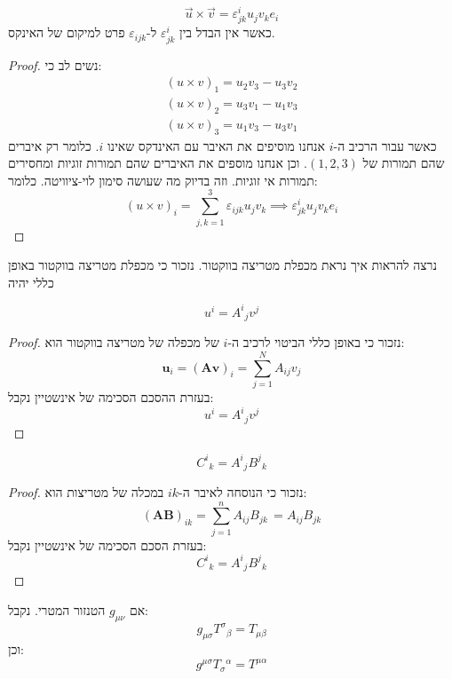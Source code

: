 \documentclass{tstextbook}
\begin{document}
\begin{proposition}
$$\vec{u}\times \vec{v}=\varepsilon_{j k}^{i}u_{j}v_{k}e_{i}$$
כאשר אין הבדל בין \(\varepsilon_{jk}^i\) ל-\(\varepsilon_{ijk}\) פרט למיקום של האינקס.

\end{proposition}
\begin{proof}
נשים לב כי:
$$\begin{array}{l}{{(u\times v)_{1}=u_{2}v_{3}-u_{3}v_{2}}}\\ {{(u\times v)_{2}=u_{3}v_{1}-u_{1}v_{3}}}\\ {{(u\times v)_{3}=u_{1}v_{3}-u_{3}v_{1}}}\end{array}$$
כאשר עבור הרכיב ה-\(i\) אנחנו מוסיפים את האיבר עם האינדקס שאינו \(i\). כלומר רק איברים שהם תמורות של \((1,2,3)\). וכן אנחנו מוספים את האיברים שהם תמורות זוגיות ומחסירים תמורות אי זוגיות. וזה בדיוק מה שעושה סימון לוי-ציוויטה. כלומר:
$$(u\times v)_{i}=\sum_{j,k=1}^{3}\varepsilon_{i j k}u_{j}v_{k}\implies \varepsilon_{j k}^{i}u_{j}v_{k}e_{i}$$

\end{proof}
נרצה להראות איך נראת מכפלת מטריצה בווקטור. נזכור כי מכפלת מטריצה בווקטור באופן כללי יהיה

\begin{proposition}
$$u^{i}={A^{i}}_{j}v^{j}$$

\end{proposition}
\begin{proof}
נזכור כי באופן כללי הביטוי לרכיב ה-\(i\) של מכפלה של מטריצה בווקטור הוא:
 $$\mathbf{u}_{i}=(\mathbf{A}\mathbf{v})_{i}=\sum_{j=1}^{N}A_{i j}v_{j}$$
 בעזרת ההסכם הסכימה של אינשטיין נקבל:
$$u^{i}={A^{i}}_{j}v^{j}$$

\end{proof}
\begin{proposition}
$${C^{i}}_{k}={A^{i}}_{j}{B^{j}}_{k}$$

\end{proposition}
\begin{proof}
נזכור כי הנוסחה לאיבר ה-\(ik\) במכלה של מטריצות הוא:
$$\left(\mathbf{A}\mathbf{B}\right)_{i k}=\sum_{j=1}^{n}A_{i j}B_{j k}\,=A_{i j}B_{j k}$$
בעזרת הסכם הסכימה של אינשטיין נקבל:
$${C^{i}}_{k}={A^{i}}_{j}{B^{j}}_{k}$$

\end{proof}
\begin{proposition}
אם \(g_{\mu \nu}\) הטנזור המטרי. נקבל:
$$g_{\mu\sigma}{T^{\sigma}}_{\beta}=T_{\mu\beta}$$
וכן:
$$g^{\mu\sigma}T_{\sigma}{}^{\alpha}=T^{\mu\alpha}$$

\end{proposition}
\end{document}
